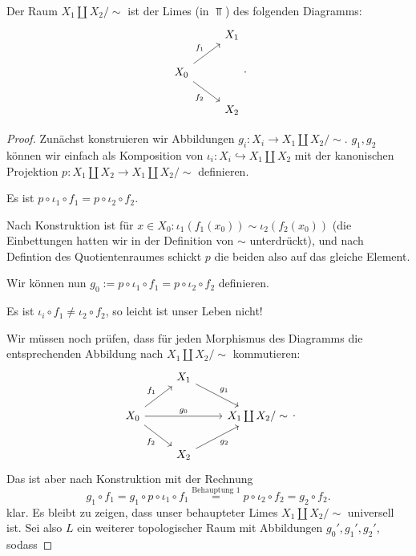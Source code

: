 \begin{trivial*}
    Der Raum $X_1 \coprod X_2 / \sim $ ist der Limes (in $\Top$) des folgenden Diagramms:
    \[
    \begin{tikzcd}
        & X_1 \\
        X_0 \ar{ur}{f_1} \ar[swap]{dr}{f_2}\\
        & X_2
    \end{tikzcd}
    .\] 
    \begin{proof}
        Zunächst konstruieren wir Abbildungen $g_i : X_i \to  X_1\coprod X_2 / \sim $. $g_1,g_2$ können wir einfach als Komposition von $ι_i: X_i \hookrightarrow X_1\coprod X_2$ mit der kanonischen Projektion $p : X_1 \coprod X_2 \to  X_1 \coprod X_2 / \sim $ definieren.
        \begin{claim}
            Es ist $p \circ  ι_1 \circ  f_1 =  p \circ  ι_2 \circ  f_2$.
        \end{claim}
        \begin{subproof}
            Nach Konstruktion ist für $x\in X_0\colon ι_1(f_1(x_0)) \sim ι_2(f_2(x_0))$ (die Einbettungen hatten wir in der Definition von  $\sim $ unterdrückt), und nach Defintion des Quotientenraumes schickt $p$ die beiden also auf das gleiche Element.
        \end{subproof}
        Wir können nun $g_0 := p \circ  ι_1 \circ  f_1 = p \circ  ι_2 \circ  f_2$ definieren.
        \begin{warning}
            Es ist $ι_i \circ  f_1 \neq  ι_2 \circ  f_2$, so leicht ist unser Leben nicht!
        \end{warning}
        Wir müssen noch prüfen, dass für jeden Morphismus des Diagramms die entsprechenden Abbildung nach  $X_1 \coprod X_2 / \sim $ kommutieren:
        \[
        \begin{tikzcd}
        & X_1 \ar{dr}{g_1}\\
            X_0 \ar{ur}{f_1} \ar[swap]{dr}{f_2} \ar{rr}{g_0} & & X_1 \coprod X_2 / \sim \\
                                                             & X_2 \ar[swap]{ur}{g_2}
        \end{tikzcd}
        .\] 
        Das ist aber nach Konstruktion mit der Rechnung
        \[
            g_1 \circ  f_1 = g_1 \circ  p \circ  ι_1 \circ  f_1 \stackrel{\text{Behauptung 1}}{=} p \circ  ι_2 \circ  f_2 = g_2 \circ  f_2
        .\] 
        klar. Es bleibt zu zeigen, dass unser behaupteter Limes $X_1 \coprod X_2 / \sim $ universell ist. Sei also $L$ ein weiterer topologischer Raum mit Abbildungen  $g_0',g_1',g_2'$, sodass 

\end{proof}
\end{trivial*}

